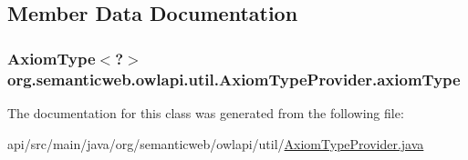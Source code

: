 \subsection{Member Data Documentation}
\hypertarget{classorg_1_1semanticweb_1_1owlapi_1_1util_1_1_axiom_type_provider_a4de9edccbd36e22c45d8540a2a42fd18}{
\subsubsection[{axiom\-Type}]{\setlength{\rightskip}{0pt plus 5cm}Axiom\-Type$<$?$>$ org.\-semanticweb.\-owlapi.\-util.\-Axiom\-Type\-Provider.\-axiom\-Type\hspace{0.3cm}{\ttfamily [private]}}}\label{classorg_1_1semanticweb_1_1owlapi_1_1util_1_1_axiom_type_provider_a4de9edccbd36e22c45d8540a2a42fd18}


The documentation for this class was generated from the following file\-:\begin{DoxyCompactItemize}
\item 
api/src/main/java/org/semanticweb/owlapi/util/\hyperlink{_axiom_type_provider_8java}{Axiom\-Type\-Provider.\-java}\end{DoxyCompactItemize}

